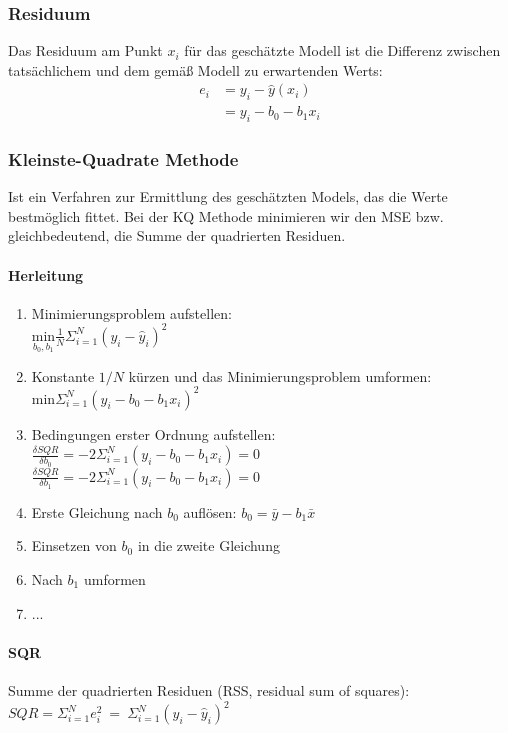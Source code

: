 \documentclass[a3paper, 8pt]{extarticle}
\begin{document}
\begin{multicols*}{5}
\subsubsection{Residuum}
Das Residuum am Punkt $x_i$ für das geschätzte Modell ist die Differenz zwischen tatsächlichem und dem gemäß Modell zu erwartenden Werts:
\begin{align*}
    e_i &=y_i - \hat{y}(x_i)\\
    &= y_i-b_0-b_1x_i
\end{align*}

\subsubsection{Kleinste-Quadrate Methode}
Ist ein Verfahren zur Ermittlung des geschätzten Models, das die Werte bestmöglich fittet. Bei der KQ Methode minimieren wir den MSE bzw. gleichbedeutend, die Summe der quadrierten Residuen.

\paragraph{Herleitung}
\begin{enumerate}
    \item Minimierungsproblem aufstellen:\\ $\underset{b_0,b_1}{\text{min}}\frac{1}{N}\Sigma_{i=1}^N(y_i-\hat{y}_i)^2 $
    \item Konstante $1/N$ kürzen und das Minimierungsproblem umformen: $\text{min}\Sigma_{i=1}^N(y_i-b_0-b_1x_i)^2$
    \item Bedingungen erster Ordnung aufstellen:\\
    $\frac{\delta SQR}{\delta b_0}=-2 \Sigma_{i=1}    ^N(y_i-b_0-b_1x_i)=0$\\
    $\frac{\delta SQR}{\delta b_1}=-2 \Sigma_{i=1}    ^N(y_i-b_0-b_1x_i)=0$
    \item Erste Gleichung nach $b_0$ auflösen: $b_0=\bar{y}-b_1\bar{x}$
    \item Einsetzen von $b_0$ in die zweite Gleichung
    \item Nach $b_1$ umformen
    \item ...
\end{enumerate}

\paragraph{SQR}Summe der quadrierten Residuen (RSS, residual sum of squares): $SQR=\Sigma_{i=1}^Ne_i^2 \: = \:\Sigma_{i=1}^N(y_i-\hat{y}_i)^2$


\end{multicols*}
\end{document}
